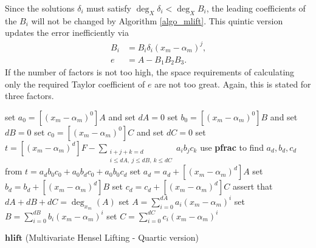 \documentclass[11pt,reqno]{amsart}
\numberwithin{equation}{section}
\newcommand{\op}[1]  { \operatorname{ #1 }}
\begin{document}
Since the solutions $\delta_i$ must satisfy $\op{deg}_{X} \delta_i < 
\op{deg}_{X} B_i$, the leading coefficients of the $B_i$ will not be changed by 
Algorithm \ref{algo_mlift}. This quintic version updates the error 
inefficiently via
\begin{align*}
B_i &= B_i \delta_i(x_m - \alpha_m)^j\text{,} \\
e &= A - B_1 B_2 B_3\text{.}
\end{align*}
If the number of factors is not too high, the space requirements of calculating 
only the required Taylor coefficient of $e$ are not too great. Again, this is 
stated for three factors.

\newpage

\begin{algorithm}[H]
\DontPrintSemicolon
{}

set $a_0 = [(x_m - \alpha_m)^0] A$ and set $dA = 0$\;
set $b_0 = [(x_m - \alpha_m)^0] B$ and set $dB = 0$\;
set $c_0 = [(x_m - \alpha_m)^0] C$ and set $dC = 0$\;
\For{$d=1$ \KwTo $\op{deg}_{x_m}(A)$}
{
	set $t = [(x_m - \alpha_m)^d]F - \sum_{\substack{i+j+k=d \\ i \le dA, \ j 
\le dB, \ k \le dC}} a_i b_j c_k$\;
	use \textbf{pfrac} to find $a_d, b_d, c_d$ from $t=a_d b_0 c_0+a_0 b_d 
c_0+a_0 b_0 c_d$\;
	set $a_d = a_d + [(x_m - \alpha_m)^d]A$\;
	set $b_d = b_d + [(x_m - \alpha_m)^d]B$\;
	set $c_d = c_d + [(x_m - \alpha_m)^d]C$\;
	\lIf{$dA + dB + dC > \op{deg}_{x_m}(A)$}{\Return{FAIL}}
}
assert that $dA + dB + dC = \op{deg}_{x_m}(A)$\;
set $A = \sum_{i=0}^{dA} a_i (x_m - \alpha_m)^i$\;
set $B = \sum_{i=0}^{dB} b_i (x_m - \alpha_m)^i$\;
set $C = \sum_{i=0}^{dC} c_i (x_m - \alpha_m)^i$\;
\caption{$\textbf{hlift}$ (Multivariate Hensel Lifting - Quartic version)}
\label{algo_mlift2}
\end{algorithm}
\end{document}
